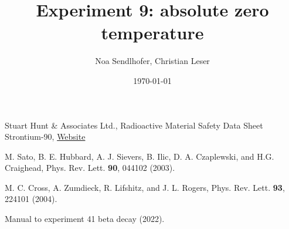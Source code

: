 \documentclass[12pt,a4paper]{article}
\title{Experiment 9: absolute zero temperature}
\author{Noa Sendlhofer, Christian Leser}
\date{\today}
\begin{document}
\maketitle

\begin{abstract}
    
\end{abstract}


\tableofcontents







\newpage










\begin{thebibliography}{99}

Stuart Hunt \& Associates Ltd., Radioactive Material Safety Data Sheet Strontium-90, \href{https://www.stuarthunt.com/de/cache/modules_elements/103/Strontium-90-Sealed.pdf}{Website}

M. Sato, B. E. Hubbard, A. J. Sievers, B. Ilic, D. A. Czaplewski, and H.G. Craighead, Phys. Rev. Lett. \textbf{90}, 044102 (2003).

M. C. Cross, A. Zumdieck, R. Lifshitz, and J. L. Rogers, Phys. Rev. Lett. \textbf{93}, 224101 (2004).

Manual to experiment 41 beta decay (2022).


\end{thebibliography}
\end{document}
